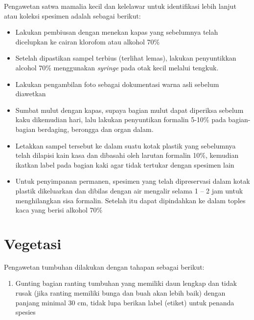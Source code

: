 \documentclass[
  oneside]{book}
\providecommand{\tightlist}{%
  \setlength{\itemsep}{0pt}\setlength{\parskip}{0pt}}
\begin{document}
Pengawetan satwa mamalia kecil dan kelelawar untuk identifikasi lebih lanjut atau koleksi spesimen adalah sebagai berikut:

\begin{itemize}
\tightlist
\item
  Lakukan pembiusan dengan menekan kapas yang sebelumnya telah dicelupkan ke cairan klorofom atau alkohol 70\%
\item
  Setelah dipastikan sampel terbius (terlihat lemas), lakukan penyuntikkan alcohol 70\% menggunakan \emph{syringe} pada otak kecil melalui tengkuk.
\item
  Lakukan pengambilan foto sebagai dokumentasi warna asli sebelum diawetkan
\item
  Sumbat mulut dengan kapas, supaya bagian mulut dapat diperiksa sebelum kaku dikemudian hari, lalu lakukan penyuntikan formalin 5-10\% pada bagian-bagian berdaging, berongga dan organ dalam.
\item
  Letakkan sampel tersebut ke dalam suatu kotak plastik yang sebelumnya telah dilapisi kain kasa dan dibasahi oleh larutan formalin 10\%, kemudian ikatkan label pada bagian kaki agar tidak tertukar dengan spesimen lain
\item
  Untuk penyimpanan permanen, spesimen yang telah dipreservasi dalam kotak plastik dikeluarkan dan dibilas dengan air mengalir selama 1 -- 2 jam untuk menghilangkan sisa formalin. Setelah itu dapat dipindahkan ke dalam toples kaca yang berisi alkohol 70\%
\end{itemize}

\hypertarget{vegetasi-1}{%
\section*{Vegetasi}\label{vegetasi-1}}

Pengawetan tumbuhan dilakukan dengan tahapan sebagai berikut:

\begin{enumerate}
\def\labelenumi{\arabic{enumi}.}
\tightlist
\item
  Gunting bagian ranting tumbuhan yang memiliki daun lengkap dan tidak rusak (jika ranting memiliki bunga dan buah akan lebih baik) dengan panjang minimal 30 cm, tidak lupa berikan label (etiket) untuk penanda spesies
\end{enumerate}
\end{document}
